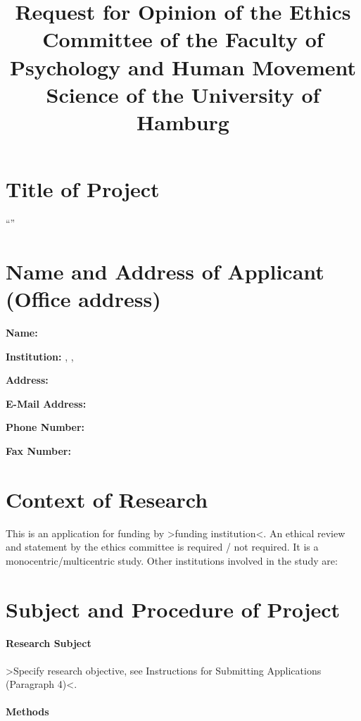 \documentclass[11pt,twoside,a4paper]{article}
\title{\vspace{-1cm}Request for Opinion of the Ethics Committee of the Faculty of Psychology and Human Movement Science of the University of Hamburg\vspace{-1.5cm}}
\begin{document}
\maketitle
\thispagestyle{fancy}

\section{Title of Project}

``\ProjectTitle{}''

\section{Name and Address of Applicant (Office address)}

\textbf{Name:} \ApplicantName{}

\textbf{Institution:} \ApplicantUniversity{}, \ApplicantInstitute{}, \ApplicantResearchGroup{}

\textbf{Address:} \ApplicantAddress{}

\textbf{E-Mail Address:} \ApplicantEmailAddress{}

\textbf{Phone Number:} \ApplicantPhoneNumber{}

\textbf{Fax Number:} \ApplicantFaxNumber{}

\section{Context of Research}

This is an application for funding by >funding institution<.
An ethical review and statement by the ethics committee is required / not required.
It is a monocentric/multicentric study.
Other institutions involved in the study are:

\section{Subject and Procedure of Project}

\paragraph{Research Subject}

>Specify research objective, see Instructions for Submitting Applications (Paragraph 4)<.

\paragraph{Methods}
\end{document}
